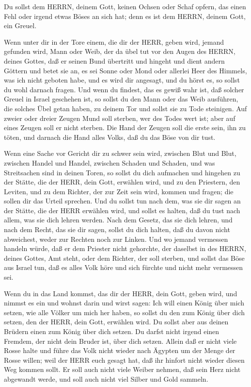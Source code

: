  Du sollst dem HERRN, deinem Gott, keinen Ochsen oder Schaf
opfern, das einen Fehl oder irgend etwas Böses an sich hat; denn es ist
dem HERRN, deinem Gott, ein Greuel.

 Wenn unter dir in der Tore einem, die dir der HERR, geben
wird, jemand gefunden wird, Mann oder Weib, der da übel tut vor den
Augen des HERRN, deines Gottes, daß er seinen Bund übertritt
 und hingeht und dient andern Göttern und betet sie an, es
sei Sonne oder Mond oder allerlei Heer des Himmels, was ich nicht
geboten habe,  und es wird dir angesagt, und du hörst es, so
sollst du wohl darnach fragen. Und wenn du findest, das es gewiß wahr
ist, daß solcher Greuel in Israel geschehen ist,  so sollst
du den Mann oder das Weib ausführen, die solches Übel getan haben, zu
deinem Tor und sollst sie zu Tode steinigen.  Auf zweier
oder dreier Zeugen Mund soll sterben, wer des Todes wert ist; aber auf
eines Zeugen soll er nicht sterben.  Die Hand der Zeugen
soll die erste sein, ihn zu töten, und darnach die Hand alles Volks, daß
du das Böse von dir tust.

 Wenn eine Sache vor Gericht dir zu schwer sein wird,
zwischen Blut und Blut, zwischen Handel und Handel, zwischen Schaden und
Schaden, und was Streitsachen sind in deinen Toren, so sollst du dich
aufmachen und hingehen zu der Stätte, die der HERR, dein Gott, erwählen
wird,  und zu den Priestern, den Leviten, und zu dem
Richter, der zur Zeit sein wird, kommen und fragen; die sollen dir das
Urteil sprechen.  Und du sollst tun nach dem, was sie dir
sagen an der Stätte, die der HERR erwählen wird, und sollst es halten,
daß du tust nach allem, was sie dich lehren werden.  Nach
dem Gesetz, das sie dich lehren, und nach dem Recht, das sie dir sagen,
sollst du dich halten, daß du davon nicht abweichest, weder zur Rechten
noch zur Linken.  Und wo jemand vermessen handeln würde,
daß er dem Priester nicht gehorchte, der daselbst in des HERRN, deines
Gottes, Amt steht, oder dem Richter, der soll sterben, und sollst das
Böse aus Israel tun,  daß es alles Volk höre und sich
fürchte und nicht mehr vermessen sei.

 Wenn du in das Land kommst, das dir der HERR, dein Gott,
geben wird, und nimmst es ein und wohnst darin und wirst sagen: Ich will
einen König über mich setzen, wie alle Völker um mich her haben,
 so sollst du den zum König über dich setzen, den der HERR,
dein Gott, erwählen wird. Du sollst aber aus deinen Brüdern einen zum
König über dich setzen. Du darfst nicht irgend einen Fremdem, der nicht
dein Bruder ist, über dich setzen.  Allein daß er nicht
viele Rosse halte und führe das Volk nicht wieder nach Ägypten um der
Menge der Rosse willen; weil der HERR euch gesagt hat, daß ihr hinfort
nicht wieder diesen Weg kommen sollt.  Er soll auch nicht
viele Weiber nehmen, daß sein Herz nicht abgewandt werde, und soll auch
nicht viel Silber und Gold sammeln.


